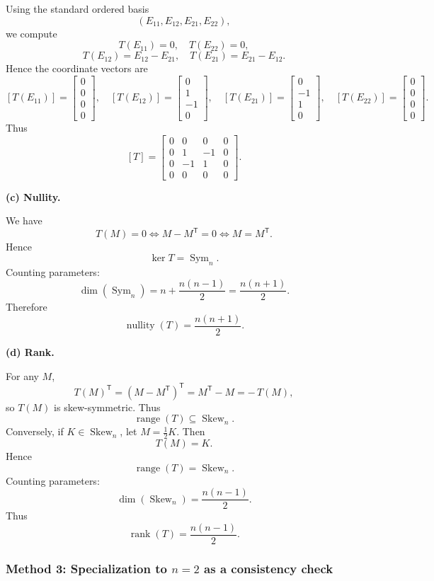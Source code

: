 \documentclass[12pt]{article}
\DeclareMathOperator{\rank}{rank}
\DeclareMathOperator{\nullity}{nullity}
\begin{document}
Using the standard ordered basis
\[
(E_{11},E_{12},E_{21},E_{22}),
\]
we compute
\[
T(E_{11})=0,
\quad
T(E_{22})=0,
\]
\[
T(E_{12})=E_{12}-E_{21},
\quad
T(E_{21})=E_{21}-E_{12}.
\]
Hence the coordinate vectors are
\[
[T(E_{11})]=\begin{bmatrix}0\\0\\0\\0\end{bmatrix},
\quad
[T(E_{12})]=\begin{bmatrix}0\\1\\-1\\0\end{bmatrix},
\quad
[T(E_{21})]=\begin{bmatrix}0\\-1\\1\\0\end{bmatrix},
\quad
[T(E_{22})]=\begin{bmatrix}0\\0\\0\\0\end{bmatrix}.
\]
Thus
\[
\boxed{
[T]=
\begin{bmatrix}
0&0&0&0\\
0&1&-1&0\\
0&-1&1&0\\
0&0&0&0
\end{bmatrix}
}.
\]

\medskip
\noindent
\textbf{(c) Nullity.}

We have
\[
T(M)=0
\iff
M-M^{\mathsf T}=0
\iff
M=M^{\mathsf T}.
\]
Hence
\[
\ker T=\operatorname{Sym}_n.
\]
Counting parameters:
\[
\dim(\operatorname{Sym}_n)
=
n+\frac{n(n-1)}{2}
=
\frac{n(n+1)}{2}.
\]
Therefore
\[
\boxed{\nullity(T)=\frac{n(n+1)}{2}}.
\]

\medskip
\noindent
\textbf{(d) Rank.}

For any $M$,
\[
T(M)^{\mathsf T}
=
(M-M^{\mathsf T})^{\mathsf T}
=
M^{\mathsf T}-M
=
-\,T(M),
\]
so $T(M)$ is skew-symmetric. Thus
\[
\operatorname{range}(T)\subseteq \operatorname{Skew}_n.
\]
Conversely, if $K\in\operatorname{Skew}_n$, let $M=\frac12 K$.
Then
\[
T(M)=K.
\]
Hence
\[
\operatorname{range}(T)=\operatorname{Skew}_n.
\]
Counting parameters:
\[
\dim(\operatorname{Skew}_n)
=
\frac{n(n-1)}{2}.
\]
Thus
\[
\boxed{\rank(T)=\frac{n(n-1)}{2}}.
\]

\subsubsection{Method 3: Specialization to $n=2$ as a consistency check}
\end{document}
